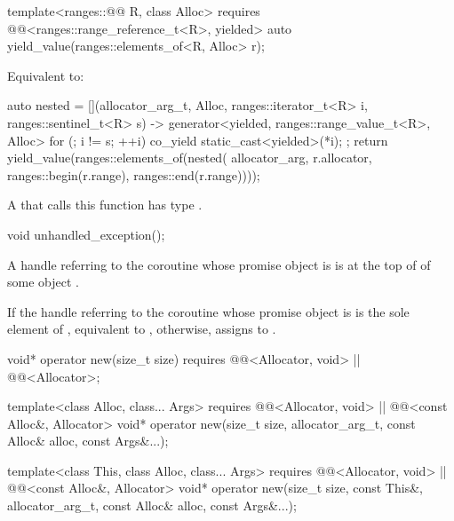 %
\begin{itemdecl}
template<ranges::@@ R, class Alloc>
  requires @@<ranges::range_reference_t<R>, yielded>
  auto yield_value(ranges::elements_of<R, Alloc> r);
\end{itemdecl}

\begin{itemdescr}
\pnum
\effects
Equivalent to:
\begin{codeblock}
auto nested = [](allocator_arg_t, Alloc, ranges::iterator_t<R> i, ranges::sentinel_t<R> s)
  -> generator<yielded, ranges::range_value_t<R>, Alloc> {
    for (; i != s; ++i) {
      co_yield static_cast<yielded>(*i);
    }
  };
return yield_value(ranges::elements_of(nested(
  allocator_arg, r.allocator, ranges::begin(r.range), ranges::end(r.range))));
\end{codeblock}

\pnum
\begin{note}
A  that calls this function
has type .
\end{note}
\end{itemdescr}

%
\begin{itemdecl}
void unhandled_exception();
\end{itemdecl}

\begin{itemdescr}
\pnum
\expects
A handle referring to the coroutine whose promise object is 
is at the top of 
of some  object .

\pnum
\effects
If the handle referring to the coroutine
whose promise object is 
is the sole element of ,
equivalent to ,
otherwise, assigns  to .
\end{itemdescr}

%
\begin{itemdecl}
void* operator new(size_t size)
  requires @@<Allocator, void> || @@<Allocator>;

template<class Alloc, class... Args>
  requires @@<Allocator, void> || @@<const Alloc&, Allocator>
  void* operator new(size_t size, allocator_arg_t, const Alloc& alloc, const Args&...);

template<class This, class Alloc, class... Args>
  requires @@<Allocator, void> || @@<const Alloc&, Allocator>
  void* operator new(size_t size, const This&, allocator_arg_t, const Alloc& alloc,
                     const Args&...);
\end{itemdecl}

